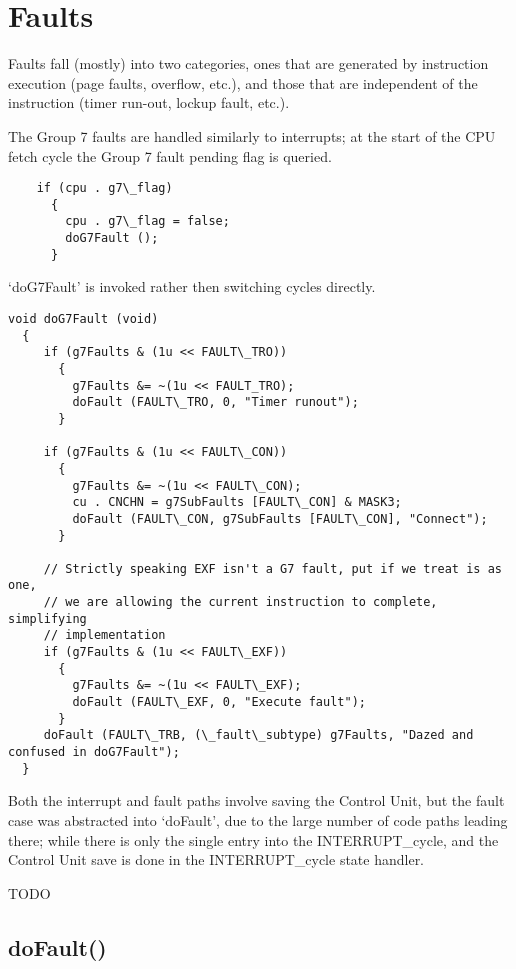 \documentclass[notitlepage]{report}
\begin{document}
\section{Faults}

Faults fall (mostly) into two categories, ones that are generated by instruction execution (page faults,
overflow, etc.), and those that are independent of the instruction (timer run-out, lockup fault, etc.).


The Group 7 faults are handled similarly to interrupts; at the start of the CPU fetch cycle the
Group 7 fault pending flag is queried.

\begin{verbatim}
    if (cpu . g7\_flag)
      {
        cpu . g7\_flag = false;
        doG7Fault ();
      }
\end{verbatim}

`doG7Fault' is invoked rather then switching 
cycles directly.

\begin{verbatim}
void doG7Fault (void)
  {
     if (g7Faults & (1u << FAULT\_TRO))
       {
         g7Faults &= ~(1u << FAULT_TRO);
         doFault (FAULT\_TRO, 0, "Timer runout");
       }

     if (g7Faults & (1u << FAULT\_CON))
       {
         g7Faults &= ~(1u << FAULT\_CON);
         cu . CNCHN = g7SubFaults [FAULT\_CON] & MASK3;
         doFault (FAULT\_CON, g7SubFaults [FAULT\_CON], "Connect");
       }

     // Strictly speaking EXF isn't a G7 fault, put if we treat is as one,
     // we are allowing the current instruction to complete, simplifying
     // implementation
     if (g7Faults & (1u << FAULT\_EXF))
       {
         g7Faults &= ~(1u << FAULT\_EXF);
         doFault (FAULT\_EXF, 0, "Execute fault");
       }
     doFault (FAULT\_TRB, (\_fault\_subtype) g7Faults, "Dazed and confused in doG7Fault");
  }
\end{verbatim}

Both the interrupt and fault paths involve saving the Control Unit, but the fault case was abstracted into
`doFault', due to the large number of code paths leading there; while there is only the single entry into
the INTERRUPT\_cycle, and the Control Unit save is done in the INTERRUPT\_cycle state handler.

TODO

\subsection{doFault()}
\end{document}
